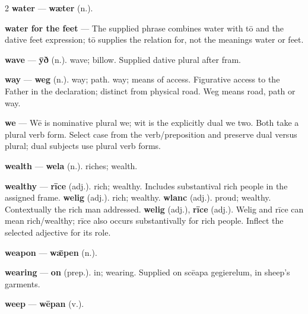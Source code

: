 \begin{multicols}{2}
\textbf{water} — \textbf{wæter} (n.).\par
\textbf{water for the feet} — The supplied phrase combines water with tō and the dative feet expression; tō supplies the relation for, not the meanings water or feet.\par
\textbf{wave} — \textbf{ȳð} (n.). wave; billow. Supplied dative plural after fram.\par
\textbf{way} — \textbf{weg} (n.). way; path. way; means of access. Figurative access to the Father in the declaration; distinct from physical road. Weg means road, path or way.\par
\textbf{we} — Wē is nominative plural we; wit is the explicitly dual we two. Both take a plural verb form. Select case from the verb/preposition and preserve dual versus plural; dual subjects use plural verb forms.\par
\textbf{wealth} — \textbf{wela} (n.). riches; wealth.\par
\textbf{wealthy} — \textbf{rīce} (adj.). rich; wealthy. Includes substantival rich people in the assigned frame. \textbf{welig} (adj.). rich; wealthy. \textbf{wlanc} (adj.). proud; wealthy. Contextually the rich man addressed. \textbf{welig} (adj.), \textbf{rīce} (adj.). Welig and rīce can mean rich/wealthy; rīce also occurs substantivally for rich people. Inflect the selected adjective for its role.\par
\textbf{weapon} — \textbf{wǣpen} (n.).\par
\textbf{wearing} — \textbf{on} (prep.). in; wearing. Supplied on scēapa gegierelum, in sheep's garments.\par
\textbf{weep} — \textbf{wēpan} (v.).\par

\end{multicols}
